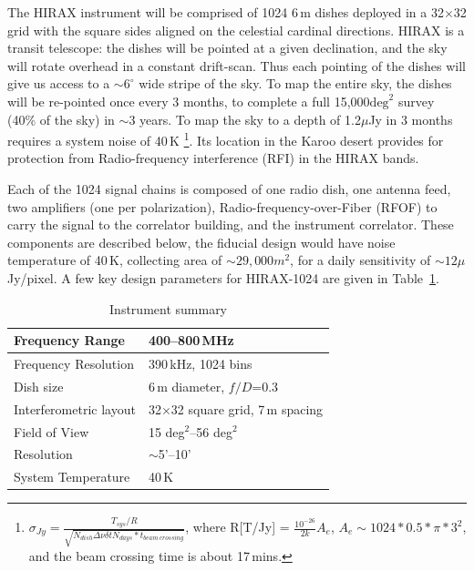 \documentclass[]{spie}  %
\begin{document}
The HIRAX instrument will be comprised of 1024 6\,m dishes deployed in a 32$\times$32 grid with the square sides aligned on the celestial cardinal directions. HIRAX is a transit telescope: the dishes will be pointed at a given declination, and the sky will rotate overhead in a constant drift-scan. Thus each pointing of the dishes will give us access to a $\sim6^{\circ}$ wide stripe of the sky. To map the entire sky, the dishes will be re-pointed once every 3 months, to complete a full 15,000$\mathrm{deg}^{2}$ survey (40\% of the sky) in $\sim$3 years. To map the sky to a depth of 1.2$\mu$Jy in 3 months requires a system noise of 40\,K \footnote {$\sigma_{Jy} = \frac{T_{sys} / R }{\sqrt{N_{dish} \Delta\nu \delta t N_{days}*t_{beam~crossing}}}$, where R[T/Jy] = $\frac{10^{-26}}{2k}A_{e}$, $A_{e}\sim1024*0.5*\pi*3^{2}$, and the beam crossing time is about 17\,mins. }. Its location in the Karoo desert provides for protection from Radio-frequency interference (RFI) in the HIRAX bands. \newline

Each of the 1024 signal chains is composed of one radio dish, one antenna feed, two amplifiers (one per polarization), Radio-frequency-over-Fiber (RFOF) to carry the signal to the correlator building, and the instrument correlator. These components are described below, the fiducial design would have noise temperature of 40\,K, collecting area of $\sim29,000m^{2}$, for a daily sensitivity of $\sim 12 \mu$Jy/pixel. A few key design parameters for HIRAX-1024 are given in Table~\ref{tab:salient}.

\begin{table}[ht]
\caption{Instrument summary} 
\label{tab:salient}
\begin{center}       
\begin{tabular}{|l|l|} 
\hline
\rule[-1ex]{0pt}{3.5ex}  Frequency Range & 400--800\,MHz  \\
\hline
\rule[-1ex]{0pt}{3.5ex}  Frequency Resolution & 390\,kHz, 1024 bins \\
\hline
\rule[-1ex]{0pt}{3.5ex}  Dish size & 6\,m diameter, $f/D$=0.3 \\
\hline
\rule[-1ex]{0pt}{3.5ex}  Interferometric layout & 32$\times$32 square grid, 7\,m spacing  \\
\hline
\rule[-1ex]{0pt}{3.5ex}  Field of View & 15 deg$^{2}$--56 deg$^{2}$ \\
\hline
\rule[-1ex]{0pt}{3.5ex}  Resolution & $\sim$5'--10'  \\
\hline 
\rule[-1ex]{0pt}{3.5ex}  System Temperature & 40\,K  \\
\hline 
\end{tabular}
\end{center}
\end{table}
\end{document}
